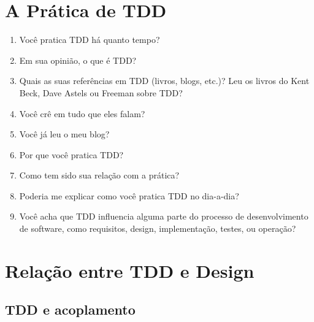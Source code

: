 \section{A Prática de TDD}
\label{entrevista:pratica}

\begin{enumerate}
	\item Você pratica TDD há quanto tempo?

	\item Em sua opinião, o que é TDD?
	
	\item Quais as suas referências em TDD (livros, blogs, etc.)? 
		  Leu os livros do Kent Beck, Dave Astels ou Freeman sobre TDD?

	\item Você crê em tudo que eles falam?
	
	\item Você já leu o meu blog?
	
	\item Por que você pratica TDD?

	\item Como tem sido sua relação com a prática?

	\item Poderia me explicar como você pratica TDD no dia-a-dia?

	\item Você acha que TDD influencia alguma parte do processo de desenvolvimento
	de software, como requisitos, design, implementação, testes, ou operação?
\end{enumerate}

\section{Relação entre TDD e Design}

\subsection{TDD e acoplamento}
\label{entrevista:acoplamento}

